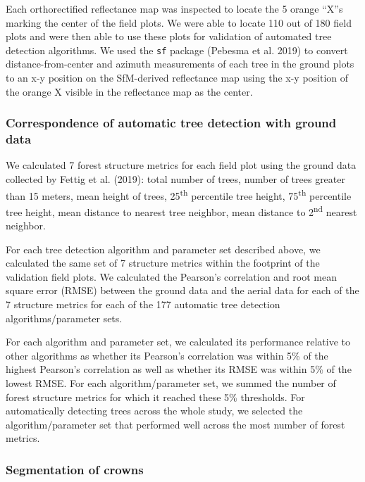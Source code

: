 \documentclass[]{article}
\begin{document}
Each orthorectified reflectance map was inspected to locate the 5 orange
``X''s marking the center of the field plots. We were able to locate 110
out of 180 field plots and were then able to use these plots for
validation of automated tree detection algorithms. We used the
\texttt{sf} package (Pebesma et al. 2019) to convert
distance-from-center and azimuth measurements of each tree in the ground
plots to an x-y position on the SfM-derived reflectance map using the
x-y position of the orange X visible in the reflectance map as the
center.

\subsubsection{Correspondence of automatic tree detection with ground
data}\label{correspondence-of-automatic-tree-detection-with-ground-data}

We calculated 7 forest structure metrics for each field plot using the
ground data collected by Fettig et al. (2019): total number of trees,
number of trees greater than 15 meters, mean height of trees,
25\textsuperscript{th} percentile tree height, 75\textsuperscript{th}
percentile tree height, mean distance to nearest tree neighbor, mean
distance to 2\textsuperscript{nd} nearest neighbor.

For each tree detection algorithm and parameter set described above, we
calculated the same set of 7 structure metrics within the footprint of
the validation field plots. We calculated the Pearson's correlation and
root mean square error (RMSE) between the ground data and the aerial
data for each of the 7 structure metrics for each of the 177 automatic
tree detection algorithms/parameter sets.

For each algorithm and parameter set, we calculated its performance
relative to other algorithms as whether its Pearson's correlation was
within 5\% of the highest Pearson's correlation as well as whether its
RMSE was within 5\% of the lowest RMSE. For each algorithm/parameter
set, we summed the number of forest structure metrics for which it
reached these 5\% thresholds. For automatically detecting trees across
the whole study, we selected the algorithm/parameter set that performed
well across the most number of forest metrics.

\subsubsection{Segmentation of crowns}\label{segmentation-of-crowns}
\end{document}
